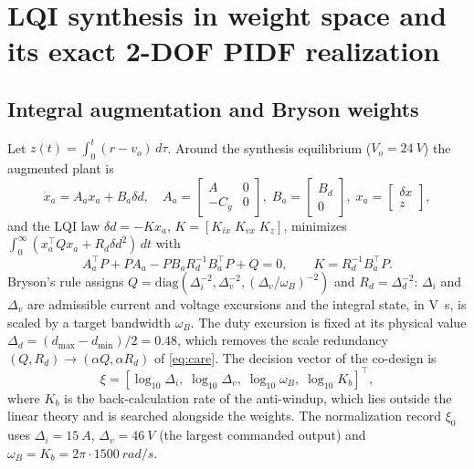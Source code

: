 \section{LQI synthesis in weight space and its exact 2-DOF PIDF realization}\label{sec:theory}

\subsection{Integral augmentation and Bryson weights}
Let $z(t)=\int_0^t(r-v_o)\,d\tau$. Around the synthesis equilibrium ($V_o=\SI{24}{V}$)
the augmented plant is
\begin{equation}
\dot x_a=A_ax_a+B_a\delta d,\quad
A_a=\begin{bmatrix}A&0\\-C_y&0\end{bmatrix},\;
B_a=\begin{bmatrix}B_d\\0\end{bmatrix},\;
x_a=\begin{bmatrix}\delta x\\z\end{bmatrix},
\label{eq:aug}
\end{equation}
and the LQI law $\delta d=-Kx_a$, $K=[K_{ix}\;K_{vx}\;K_z]$, minimizes
$\int_0^\infty(x_a^\top Qx_a+R_d\delta d^2)\,dt$ with
\begin{equation}
A_a^\top P+PA_a-PB_aR_d^{-1}B_a^\top P+Q=0,\qquad K=R_d^{-1}B_a^\top P .
\label{eq:care}
\end{equation}
Bryson's rule assigns $Q=\mathrm{diag}(\Delta_i^{-2},\Delta_v^{-2},(\Delta_v/\omega_B)^{-2})$
and $R_d=\Delta_d^{-2}$: $\Delta_i$ and $\Delta_v$ are admissible current and
voltage excursions and the integral state, in \si{V.s}, is scaled by a target
bandwidth $\omega_B$. The duty excursion is fixed at its physical value
$\Delta_d=(d_{\max}-d_{\min})/2=0.48$, which removes the scale redundancy
$(Q,R_d)\to(\alpha Q,\alpha R_d)$ of \eqref{eq:care}. The decision vector of the
co-design is
\begin{equation}
\xi=[\log_{10}\Delta_i,\;\log_{10}\Delta_v,\;\log_{10}\omega_B,\;\log_{10}K_b]^\top ,
\label{eq:xi}
\end{equation}
where $K_b$ is the back-calculation rate of the anti-windup, which lies outside
the linear theory and is searched alongside the weights. The normalization
record $\xi_0$ uses $\Delta_i=\SI{15}{A}$, $\Delta_v=\SI{46}{V}$ (the largest
commanded output) and $\omega_B=K_b=2\pi\cdot\SI{1500}{rad/s}$.

